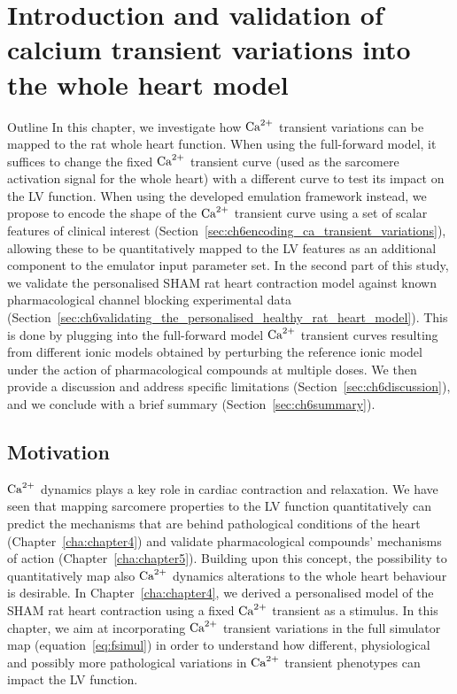 \chapter{Introduction and validation of calcium transient variations into the whole heart model}\label{cha:chapter6}
%
%
%
\begin{remark}{Outline}
    In this chapter, we investigate how $\textrm{Ca}^{2+}$ transient variations can be mapped to the rat whole heart function. When using the full-forward model, it suffices to change the fixed $\textrm{Ca}^{2+}$ transient curve (used as the sarcomere activation signal for the whole heart) with a different curve to test its impact on the LV function. When using the developed emulation framework instead, we propose to encode the shape of the $\textrm{Ca}^{2+}$ transient curve using a set of scalar features of clinical interest (Section~\ref{sec:ch6encoding_ca_transient_variations}), allowing these to be quantitatively mapped to the LV features as an additional component to the emulator input parameter set. In the second part of this study, we validate the personalised SHAM rat heart contraction model against known pharmacological channel blocking experimental data (Section~\ref{sec:ch6validating_the_personalised_healthy_rat_heart_model}). This is done by plugging into the full-forward model $\textrm{Ca}^{2+}$ transient curves resulting from different ionic models obtained by perturbing the reference ionic model under the action of pharmacological compounds at multiple doses. We then provide a discussion and address specific limitations (Section~\ref{sec:ch6discussion}), and we conclude with a brief summary (Section~\ref{sec:ch6summary}).
\end{remark}


%
%
%
\section{Motivation}\label{sec:ch6motivation}
$\textrm{Ca}^{2+}$ dynamics plays a key role in cardiac contraction and relaxation. We have seen that mapping sarcomere properties to the LV function quantitatively can predict the mechanisms that are behind pathological conditions of the heart (Chapter~\ref{cha:chapter4}) and validate pharmacological compounds' mechanisms of action (Chapter~\ref{cha:chapter5}). Building upon this concept, the possibility to quantitatively map also $\textrm{Ca}^{2+}$ dynamics alterations to the whole heart behaviour is desirable. In Chapter~\ref{cha:chapter4}, we derived a personalised model of the SHAM rat heart contraction using a fixed $\textrm{Ca}^{2+}$ transient as a stimulus. In this chapter, we aim at incorporating $\textrm{Ca}^{2+}$ transient variations in the full simulator map (equation~\ref{eq:fsimul}) in order to understand how different, physiological and possibly more pathological variations in $\textrm{Ca}^{2+}$ transient phenotypes can impact the LV function.


